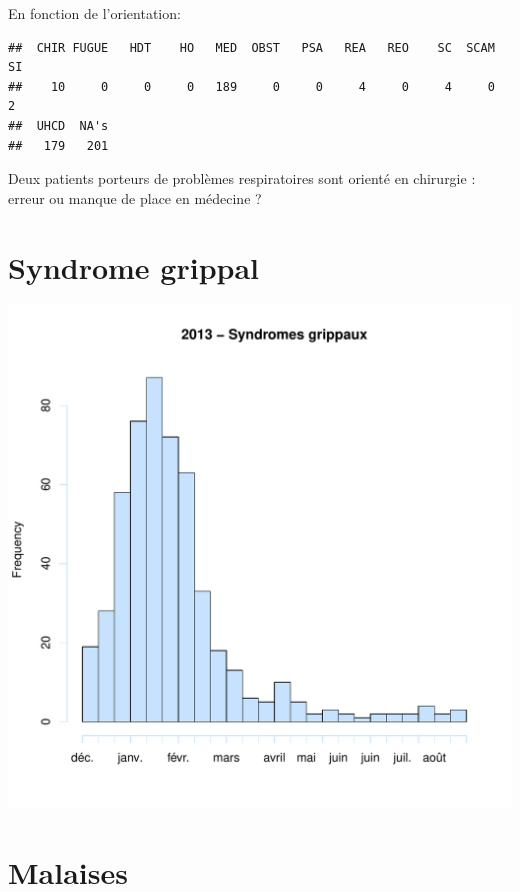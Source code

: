 \documentclass[12pt,english,french,twoside]{report}\usepackage[]{graphicx}\usepackage[]{color}
\makeatletter
\def\maxwidth{ %
  \ifdim\Gin@nat@width>\linewidth
    \linewidth
  \else
    \Gin@nat@width
  \fi
}
\newenvironment{kframe}{%
 \def\at@end@of@kframe{}%
 \ifinner\ifhmode%
  \def\at@end@of@kframe{\end{minipage}}%
  \begin{minipage}{\columnwidth}%
 \fi\fi%
 \def\FrameCommand##1{\hskip\@totalleftmargin \hskip-\fboxsep
 \colorbox{shadecolor}{##1}\hskip-\fboxsep
     \hskip-\linewidth \hskip-\@totalleftmargin \hskip\columnwidth}%
 \MakeFramed {\advance\hsize-\width
   \@totalleftmargin\z@ \linewidth\hsize
   \@setminipage}}%
 {\par\unskip\endMakeFramed%
 \at@end@of@kframe}
\newenvironment{knitrout}{}{} %
\makeatother
\begin{document}
En fonction de l'orientation:
\begin{knitrout}
\color{fgcolor}\begin{kframe}
\begin{verbatim}
##  CHIR FUGUE   HDT    HO   MED  OBST   PSA   REA   REO    SC  SCAM    SI 
##    10     0     0     0   189     0     0     4     0     4     0     2 
##  UHCD  NA's 
##   179   201
\end{verbatim}
\end{kframe}
\end{knitrout}


Deux patients porteurs de problèmes respiratoires sont orienté en chirurgie : erreur ou manque de place en médecine ?

\section{Syndrome grippal}

\begin{knitrout}
\color{fgcolor}
\includegraphics[width=\maxwidth]{figure/grippe} 

\end{knitrout}


\section{Malaises}
\end{document}
